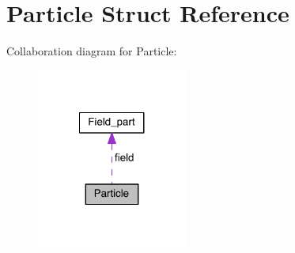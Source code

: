 \hypertarget{struct_particle}{}\section{Particle Struct Reference}
\label{struct_particle}


Collaboration diagram for Particle\+:
\nopagebreak
\begin{figure}[H]
\begin{center}
\leavevmode
\includegraphics[width=140pt]{struct_particle__coll__graph}
\end{center}
\end{figure}
